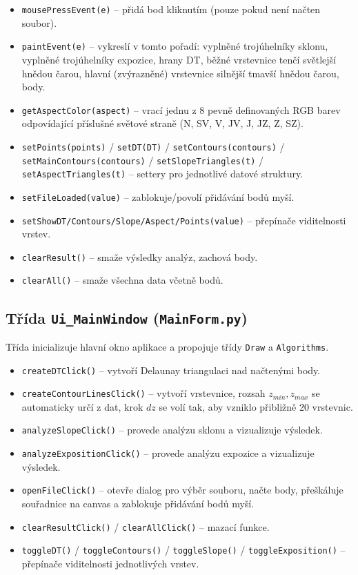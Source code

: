 \documentclass[11pt, a4paper]{article}
\begin{document}
\begin{itemize}
\item \texttt{mousePressEvent(e)} -- přidá bod kliknutím (pouze pokud není načten soubor).
\item \texttt{paintEvent(e)} -- vykreslí v tomto pořadí: vyplněné trojúhelníky sklonu, vyplněné trojúhelníky expozice, hrany DT, běžné vrstevnice tenčí světlejší hnědou čarou, hlavní (zvýrazněné) vrstevnice silnější tmavší hnědou čarou, body.
\item \texttt{getAspectColor(aspect)} -- vrací jednu z 8 pevně definovaných RGB barev odpovídající příslušné světové straně (N, SV, V, JV, J, JZ, Z, SZ).
\item \texttt{setPoints(points)} / \texttt{setDT(DT)} / \texttt{setContours(contours)} / \texttt{setMainContours(contours)} / \texttt{setSlopeTriangles(t)} / \texttt{setAspectTriangles(t)} -- settery pro jednotlivé datové struktury.
\item \texttt{setFileLoaded(value)} -- zablokuje/povolí přidávání bodů myší.
\item \texttt{setShowDT/Contours/Slope/Aspect/Points(value)} -- přepínače viditelnosti vrstev.
\item \texttt{clearResult()} -- smaže výsledky analýz, zachová body.
\item \texttt{clearAll()} -- smaže všechna data včetně bodů.
\end{itemize}

\subsection{Třída \texttt{Ui\_MainWindow} (\texttt{MainForm.py})}
Třída inicializuje hlavní okno aplikace a propojuje třídy \texttt{Draw} a \texttt{Algorithms}.

\begin{itemize}
\item \texttt{createDTClick()} -- vytvoří Delaunay triangulaci nad načtenými body.
\item \texttt{createContourLinesClick()} -- vytvoří vrstevnice, rozsah $z_{min}, z_{max}$ se automaticky určí z dat, krok $dz$ se volí tak, aby vzniklo přibližně 20 vrstevnic.
\item \texttt{analyzeSlopeClick()} -- provede analýzu sklonu a vizualizuje výsledek.
\item \texttt{analyzeExpositionClick()} -- provede analýzu expozice a vizualizuje výsledek.
\item \texttt{openFileClick()} -- otevře dialog pro výběr souboru, načte body, přeškáluje souřadnice na canvas a zablokuje přidávání bodů myší.
\item \texttt{clearResultClick()} / \texttt{clearAllClick()} -- mazací funkce.
\item \texttt{toggleDT()} / \texttt{toggleContours()} / \texttt{toggleSlope()} / \texttt{toggleExposition()} -- přepínače viditelnosti jednotlivých vrstev.
\end{itemize}
\end{document}
